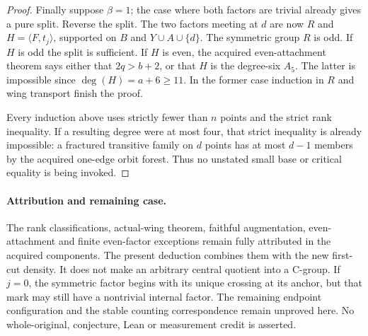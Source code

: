 \documentclass[11pt,a4paper]{article}
\newcommand{\gen}[1]{\langle#1\rangle}
\begin{document}
\begin{proof}
Finally suppose $\beta=1$; the case where both factors
are trivial already gives a pure split. Reverse the
split. The two factors meeting at $d$ are now $R$ and
$H=\gen{F,t_j}$, supported on $B$ and
$Y\cup A\cup\{d\}$. The symmetric group $R$ is odd.
If $H$ is odd the split is sufficient. If $H$ is even,
the acquired even-attachment theorem says either that
$2q>b+2$, or that $H$ is the degree-six $A_5$.
The latter is impossible since $\deg(H)=a+6\ge11$.
In the former case induction in $R$ and wing transport
finish the proof.

Every induction above uses strictly fewer than $n$
points and the strict rank inequality. If a resulting
degree were at most four, that strict inequality is
already impossible: a fractured transitive family on
$d$ points has at most $d-1$ members by the acquired
one-edge orbit forest. Thus no unstated small base or
critical equality is being invoked.
\end{proof}

\paragraph{Attribution and remaining case.}
The rank classifications, actual-wing theorem, faithful
augmentation, even-attachment and finite even-factor
exceptions remain fully attributed in the acquired
components. The present deduction combines them with
the new first-cut density. It does not make an arbitrary
central quotient into a C-group. If $j=0$, the symmetric
factor begins with its unique crossing at its anchor,
but that mark may still have a nontrivial internal
factor. The remaining endpoint configuration and the
stable counting correspondence remain unproved here.
No whole-original, conjecture, Lean or measurement
credit is asserted.
\end{document}
